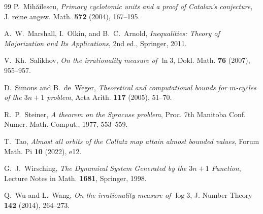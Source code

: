 \documentclass[11pt, a4paper]{amsart}
\theoremstyle{plain}
\theoremstyle{definition}
\theoremstyle{remark}
\begin{document}
\begin{thebibliography}{99}
P.~Mih\u{a}ilescu,
\emph{Primary cyclotomic units and a proof of Catalan's
conjecture},
J. reine angew. Math. \textbf{572} (2004), 167--195.

A.~W.~Marshall, I.~Olkin, and B.~C.~Arnold,
\emph{Inequalities: Theory of Majorization and Its Applications},
2nd ed., Springer, 2011.

V.~Kh.~Salikhov,
\emph{On the irrationality measure of $\ln 3$},
Dokl. Math. \textbf{76} (2007), 955--957.

D.~Simons and B.~de~Weger,
\emph{Theoretical and computational bounds for $m$-cycles of
the $3n + 1$ problem},
Acta Arith. \textbf{117} (2005), 51--70.

R.~P.~Steiner,
\emph{A theorem on the Syracuse problem},
Proc. 7th Manitoba Conf. Numer. Math. Comput.,
1977, 553--559.

T.~Tao,
\emph{Almost all orbits of the Collatz map attain almost bounded
values},
Forum Math. Pi \textbf{10} (2022), e12.

G.~J.~Wirsching,
\emph{The Dynamical System Generated by the $3n + 1$ Function},
Lecture Notes in Math. \textbf{1681}, Springer, 1998.

Q.~Wu and L.~Wang,
\emph{On the irrationality measure of $\log 3$},
J. Number Theory \textbf{142} (2014), 264--273.

\end{thebibliography}
\end{document}
